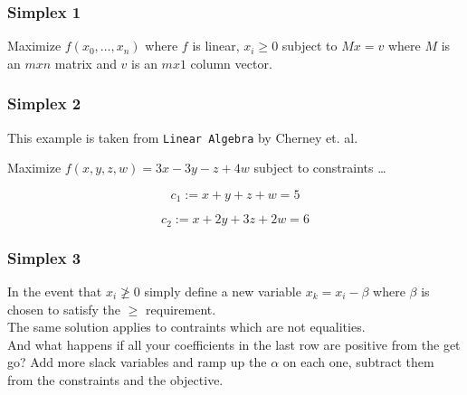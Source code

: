 \documentclass{beamer}
\begin{document}
\begin{frame}
\frametitle{Simplex 1}

    Maximize $f(x_{0},\ldots,x_{n})$ where $f$ is linear, $x_{i}\geq0$ subject
    to $Mx=v$ where $M$ is an $mxn$ matrix and $v$ is an $mx1$ column vector.

\end{frame}

\begin{frame}
\frametitle{Simplex 2}

    This example is taken from \texttt{Linear Algebra} by Cherney et. al.

    \hspace{2cm}

    Maximize $f(x,y,z,w) = 3x - 3y - z + 4w$ subject to constraints \ldots

    \hspace{2cm}

    \begin{equation}
    \label{c1}
        c_{1} := x + y + z + w = 5
    \end{equation}

    \begin{equation}
    \label{c2}
        c_{2} := x + 2y + 3z + 2w = 6 
    \end{equation}

\end{frame}
    
\begin{frame}
\frametitle{Simplex 3}

    In the event that $x_{i} \ngeq 0$ simply define a new variable $x_{k} = x_{i} - \beta$ where $\beta$ is chosen to satisfy the $\geq$ requirement.\\
    The same solution applies to contraints which are not equalities.\\
    And what happens if all your coefficients in the last row are positive from
    the get go? Add more slack variables and ramp up the $\alpha$ on each one,
    subtract them from the constraints and the objective.

\end{frame}
\end{document}
